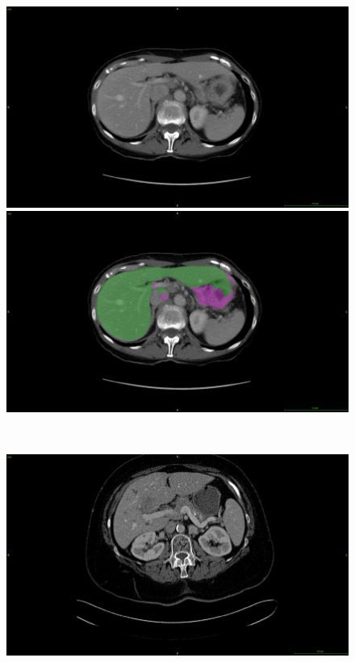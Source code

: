 \begin{figure}[ht!]
	\centering
	\begin{minipage}{0.45\linewidth}
		\includegraphics[width=\linewidth]{../Contributions/images/MisSegmentations/ResizeTCGA-BC-A3KF_slice61_raw}
	\end{minipage} \hspace{-0.1cm}
	\begin{minipage}{0.45\linewidth}
		\includegraphics[width=\linewidth]{../Contributions/images/MisSegmentations/ResizeTCGA-BC-A3KF_slice61_liverPrediction_Cmap}
	\end{minipage} \\
	\begin{minipage}{0.45\linewidth}
		\includegraphics[width=\linewidth]{../Contributions/images/MisSegmentations/ResizeTCGA-BC-A10Z_slice30_raw}

\end{minipage}
\end{figure}
